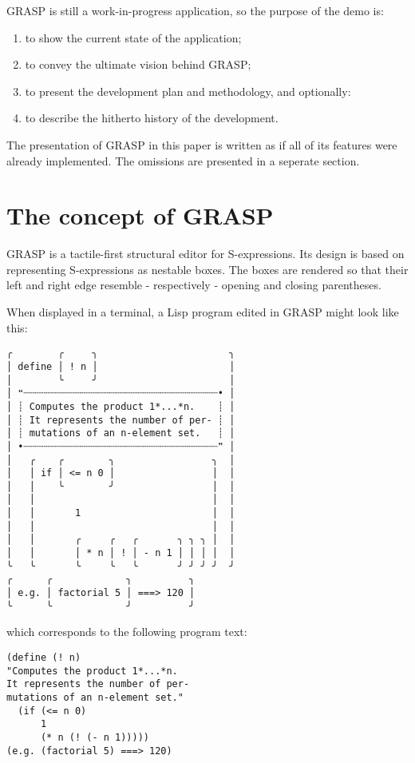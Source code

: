 \documentclass[11pt]{article}
\begin{document}
GRASP is still a work-in-progress application, so the purpose
of the demo is:
\begin{enumerate}
\item to show the current state of the application;
\item to convey the ultimate vision behind GRASP;
\item to present the development plan and methodology, and optionally:
\item to describe the hitherto history of the development.
\end{enumerate}

The presentation of GRASP in this paper is written as if
all of its features were already implemented. The omissions
are presented in a seperate section.

\section{The concept of GRASP}
\label{sec:orge818709}

GRASP is a tactile-first structural editor for S-expressions.
Its design is based on representing S-expressions as
nestable boxes. The boxes are rendered so that their left 
and right edge resemble - respectively - opening and closing 
parentheses.

When displayed in a terminal, a Lisp program edited in GRASP
might look like this:

\begin{verbatim}
╭        ╭     ╮                       ╮
│ define │ ! n │                       │
│        ╰     ╯                       │
│ ❝┈┈┈┈┈┈┈┈┈┈┈┈┈┈┈┈┈┈┈┈┈┈┈┈┈┈┈┈┈┈┈┈┈┈• │
│ ┊ Computes the product 1*...*n.    ┊ │
│ ┊ It represents the number of per- ┊ │
│ ┊ mutations of an n-element set.   ┊ │
│ •┈┈┈┈┈┈┈┈┈┈┈┈┈┈┈┈┈┈┈┈┈┈┈┈┈┈┈┈┈┈┈┈┈┈❞ │
│   ╭    ╭        ╮                 ╮  │
│   │ if │ <= n 0 │                 │  │
│   │    ╰        ╯                 │  │
│   │                               │  │
│   │       1                       │  │
│   │                               │  │
│   │       ╭     ╭   ╭       ╮ ╮ ╮ │  │
│   │       │ * n │ ! │ - n 1 │ │ │ │  │
╰   ╰       ╰     ╰   ╰       ╯ ╯ ╯ ╯  ╯
╭      ╭             ╮          ╮       
│ e.g. │ factorial 5 │ ===> 120 │       
╰      ╰             ╯          ╯       
\end{verbatim}

which corresponds to the following program text:

\begin{verbatim}
(define (! n)
"Computes the product 1*...*n.
It represents the number of per-
mutations of an n-element set."
  (if (<= n 0)
      1
      (* n (! (- n 1))))) 
(e.g. (factorial 5) ===> 120)
\end{verbatim}
\end{document}
